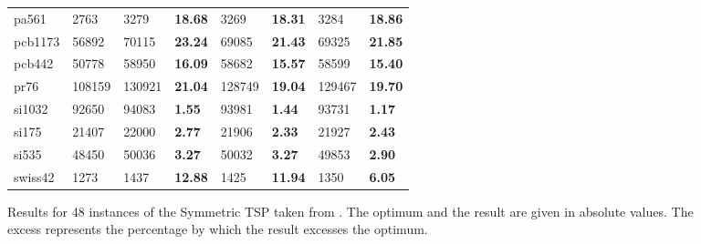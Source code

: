 \begin{figure}[ht]
\begin{minipage}{\linewidth}
\begin{tabular}{*{3}{L{1.6cm}} >{\bfseries}L{1.6cm} L{1.6cm} >{\bfseries}L{1.6cm} L{1.6cm} >{\bfseries}L{1.6cm}}
			pa561     & 2763   & 3279   & 18.68  & 3269   & 18.31 & 3284   & 18.86  \\
			pcb1173   & 56892  & 70115  & 23.24  & 69085  & 21.43 & 69325  & 21.85  \\
			pcb442    & 50778  & 58950  & 16.09  & 58682  & 15.57 & 58599  & 15.40  \\
			pr76      & 108159 & 130921 & 21.04  & 128749 & 19.04 & 129467 & 19.70  \\
			si1032    & 92650  & 94083  & 1.55   & 93981  & 1.44  & 93731  & 1.17   \\
			si175     & 21407  & 22000  & 2.77   & 21906  & 2.33  & 21927  & 2.43   \\
			si535     & 48450  & 50036  & 3.27   & 50032  & 3.27  & 49853  & 2.90   \\
			swiss42   & 1273   & 1437   & 12.88  & 1425   & 11.94 & 1350   & 6.05   \\
			\bottomrule
		\end{tabular}
	\end{minipage}
	
	\caption{Results for 48 instances of the Symmetric TSP taken from \cite{REINELT1995}. The optimum and the result are given in absolute values. The excess represents the percentage by which the result excesses the optimum.}
	\label{fig:STSP}
\end{figure}

